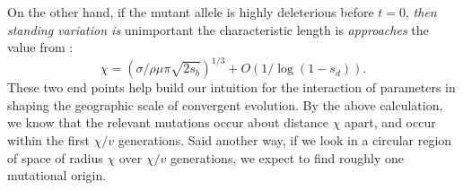 \documentclass{article}
\newcommand{\gc}[1]{{\it\color{blue}#1}}
\begin{document}
On the other hand, if the mutant allele is highly deleterious before $t=0$,
\gc{then standing variation is} unimportant the characteristic length is \gc{approaches} the value from \citet{ralphcoop2010}:
\begin{equation} \label{eqn:chi_new}
\chi = ( \sigma / \rho \mu \pi \sqrt{2 s_b} )^{1/3} + O(1/\log(1-s_d)).
\end{equation}
These two end points help build our intuition for the interaction of
parameters in shaping the geographic scale of convergent evolution.
By the above calculation, we know that the relevant mutations occur about distance $\chi$ apart, 
 and occur within the first $\chi/v$ generations.
 Said another way, if we look in a circular region of space of radius $\chi$ over $\chi/v$ generations,
 we expect to find roughly one mutational origin.


\end{document}
